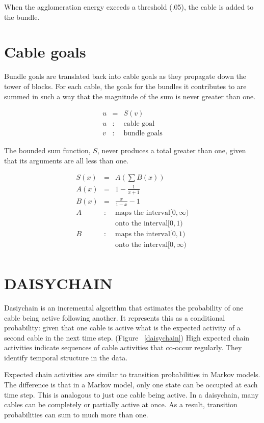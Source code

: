 \documentclass[oneside,twocolumn]{article}
\begin{document}
When the agglomeration energy exceeds a threshold (.05), the cable is added to the bundle.

\section*{\color{copper} Cable goals}
        
Bundle goals are translated back into cable goals as they propagate down the tower of blocks. For each cable, the goals for the bundles it contributes to are summed in such a way that the magnitude of the sum is never greater than one.

\begin{eqnarray*}
u &=& S(v)\\ 
u &:& \mbox{cable goal}\\
v &:& \mbox{bundle goals}
\end{eqnarray*}

The bounded sum function, $S$, never produces a total greater than one, given that its arguments are all less than one.

\begin{eqnarray*}
S(x) & = & A \left (\sum B(x) \right ) \\
A(x) & = & 1 - \frac{1}{x + 1} \\ 
B(x) & = & \frac{x}{1 - x} - 1 \\
A&:& \mbox{maps the interval} [0, \infty)\\
&& \mbox{onto the interval} [0, 1) \\
B&:& \mbox{maps the interval} [0, 1)\\
&& \mbox{onto the interval} [0,\infty ) \\
\end{eqnarray*}


\section*{\color{copper} DAISYCHAIN}

Dasiychain is an incremental algorithm that estimates the probability of one cable being active following another. It represents this as a conditional probability: given that one cable is active what is the expected activity of a second cable in the next time step. (Figure ~\ref{daisychain}) High expected chain activities indicate sequences of cable activities that co-occur regularly. They identify temporal structure in the data. 

Expected chain activities are similar to transition probabilities in Markov models. The difference is that in a Markov model, only one state can be occupied at each time step. This is analogous to just one cable being active. In a daisychain, many cables can be completely or partially active at once. As a result, transition probabilities can sum to much more than one. 
\end{document}
